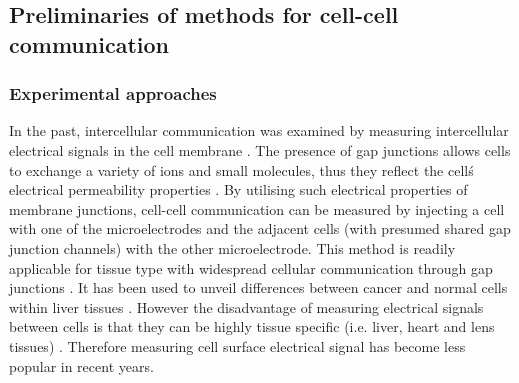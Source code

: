 \subsection{Preliminaries of methods for cell-cell communication}
\subsubsection{Experimental approaches}
In the past, intercellular communication was examined by measuring intercellular electrical signals in the cell membrane \cite{bennett1966physiology, loewenstein1967intercellular, de1982cell}. The presence of gap junctions allows cells to exchange a variety of ions and small molecules, thus they reflect the cell\'s electrical permeability properties \cite{penn1966ionic, bennett1966physiology,loewenstein1966permeability,loewenstein1974cellular}. By utilising such electrical properties of membrane junctions, cell-cell communication can be measured by injecting a cell with one of the microelectrodes and the adjacent cells (with presumed shared gap junction channels) with the other microelectrode. This method is readily applicable for tissue type with widespread cellular communication through gap junctions \cite{penn1966ionic}. It has been used to unveil differences between cancer and normal cells within liver tissues \cite{loewenstein1966intercellular, loewenstein1967intercellular}. However the disadvantage of measuring electrical signals between cells is that they can be highly tissue specific (i.e. liver, heart and lens tissues) \cite{gros1983comparative}. Therefore measuring cell surface electrical signal has become less popular in recent years. 


